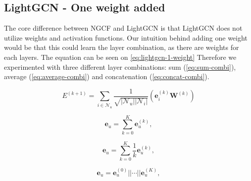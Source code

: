 \subsection{LightGCN - One weight added}
The core difference between NGCF and LightGCN is that LightGCN does not utilize weights and activation functions.
Our intuition behind adding one weight would be that this could learn the layer combination, as there are weights for each layers.
The equation can be seen on \autoref{eq:lightgcn-1-weight}
Therefore we experimented with three different layer combinations: sum (\autoref{eq:sum-combi}), average (\autoref{eq:average-combi}) and concatenation (\autoref{eq:concat-combi}).

\begin{equation}
    E^{(k+1)} = \sum_{i \in \mathcal{N}_u} \frac{1}{\sqrt{|\mathcal{N}_u||\mathcal{N}_i|}}\left( \mathbf{e}_i^{(k)} \mathbf{W}^{(k)} \right)
    \label{eq:lightgcn-1-weight}
\end{equation}

\begin{equation}
    \mathbf{e}_u = \sum_{k=0}^{K} \mathbf{e}_u^{(k)},
    \label{eq:sum-combi}
\end{equation}

\begin{equation}
    \mathbf{e}_u = \sum_{k=0}^{K} \frac{1}{k} \mathbf{e}_u^{(k)},
    \label{eq:average-combi}
\end{equation}

\begin{equation}
    \mathbf{e}_u = \mathbf{e}_u^{(0)}|| \cdots || \mathbf{e}_u^{(K)},
    \label{eq:concat-combi}
\end{equation}